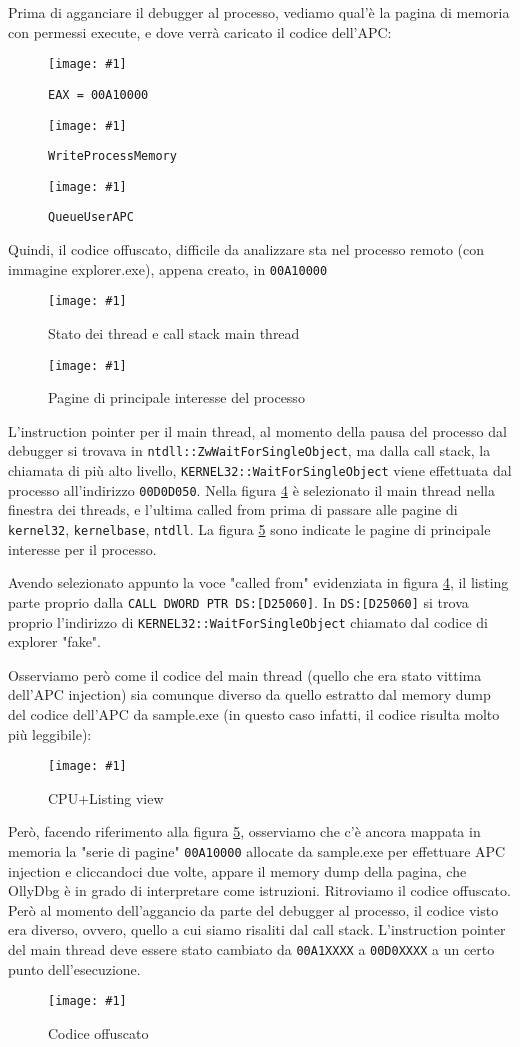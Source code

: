 \documentclass[
    a4paper, %
    11pt %
]{article}
\newcommand{\pic}[4]{\begin{figure}[H]
            \centering
            \texttt{[image: \#1]}
            \caption{#2}
            \label{fig:#1}
            \end{figure}}
\begin{document}
            Prima di agganciare il debugger al processo, vediamo qual'è la pagina di memoria con permessi execute,
            e dove verrà caricato il codice dell'APC:
            \pic{sample_vex}{\texttt{EAX = 00A10000}}{18cm}{3cm}
            \pic{sample_wpm}{\texttt{WriteProcessMemory}}{18cm}{3cm}
            \pic{sample_qua}{\texttt{QueueUserAPC}}{18cm}{3cm}

            Quindi, il codice offuscato, difficile da analizzare sta nel processo remoto (con immagine explorer.exe), appena creato, in
            \texttt{00A10000}

            \pic{explorer_threads}{Stato dei thread e call stack main thread}{15cm}{10cm}
            \pic{explorer_pages}{Pagine di principale interesse del processo}{10cm}{5cm}
            
            L'instruction pointer per il main thread, al momento della pausa del processo dal debugger
            si trovava in \texttt{ntdll::ZwWaitForSingleObject}, ma dalla call stack, la chiamata di più alto
            livello, \texttt{KERNEL32::WaitForSingleObject} viene effettuata dal processo all'indirizzo
            \texttt{00D0D050}. Nella figura \ref{fig:explorer_threads} è selezionato il main thread nella finestra
            dei threads, e l'ultima called from prima di passare alle pagine di \texttt{kernel32}, 
            \texttt{kernelbase}, \texttt{ntdll}. La figura \ref{fig:explorer_pages} sono indicate le pagine
            di principale interesse per il processo.

            Avendo selezionato appunto la voce "called from" evidenziata in figura \ref{fig:explorer_threads},
            il listing parte proprio dalla \texttt{CALL DWORD PTR DS:[D25060]}. In \texttt{DS:[D25060]} si trova
            proprio l'indirizzo di \texttt{KERNEL32::WaitForSingleObject} chiamato dal codice di explorer "fake".

            Osserviamo però come il codice del main thread (quello che era stato vittima dell'APC injection) sia
            comunque diverso da quello estratto dal memory dump del codice dell'APC da sample.exe (in questo
            caso infatti, il codice risulta molto più leggibile):
            \pic{explorer_listing}{CPU+Listing view}{15cm}{10cm}

            Però, facendo riferimento alla figura \ref{fig:explorer_pages}, osserviamo che c'è ancora mappata in
            memoria la "serie di pagine" \texttt{00A10000} allocate da sample.exe per effettuare APC injection e 
            cliccandoci due volte, appare il memory dump della
            pagina, che OllyDbg è in grado di interpretare come istruzioni. Ritroviamo il codice offuscato. Però
            al momento dell'aggancio da parte del debugger al processo, il codice visto era diverso, ovvero, quello a cui
            siamo risaliti dal call stack. L'instruction pointer del main thread deve essere stato cambiato da \texttt{00A1XXXX} a
            \texttt{00D0XXXX} a un certo punto dell'esecuzione.
            \pic{explorer_shellcode_listing}{Codice offuscato}{11cm}{10cm}
\end{document}
